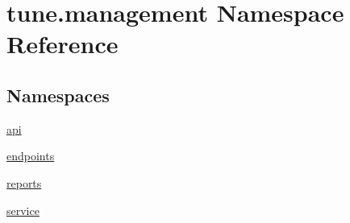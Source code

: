 \hypertarget{namespacetune_1_1management}{\section{tune.\-management Namespace Reference}
\label{namespacetune_1_1management}
}
\subsection*{Namespaces}
\begin{DoxyCompactItemize}
\item 
\hyperlink{namespacetune_1_1management_1_1api}{api}
\item 
\hyperlink{namespacetune_1_1management_1_1endpoints}{endpoints}
\item 
\hyperlink{namespacetune_1_1management_1_1reports}{reports}
\item 
\hyperlink{namespacetune_1_1management_1_1service}{service}
\end{DoxyCompactItemize}
